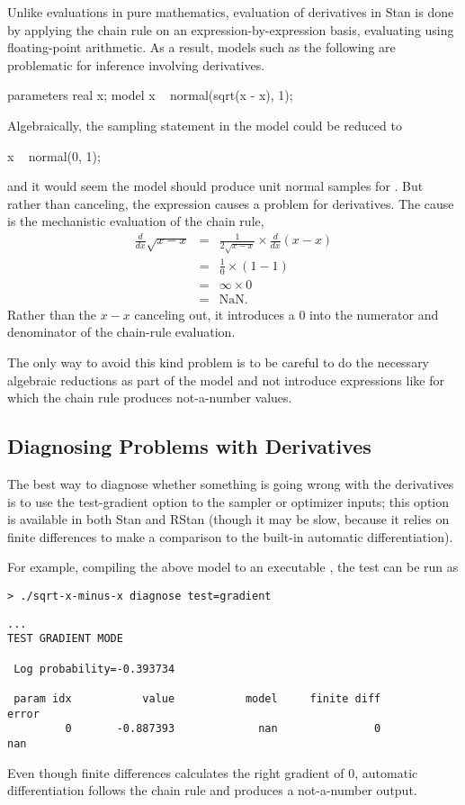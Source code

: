 Unlike evaluations in pure mathematics, evaluation of derivatives in
Stan is done by applying the chain rule on an expression-by-expression
basis, evaluating using floating-point arithmetic.  As a result,
models such as the following are problematic for inference involving
derivatives.
%
\begin{stancode}
parameters {
  real x;
}
model {
  x ~ normal(sqrt(x - x), 1);
}
\end{stancode}
%
Algebraically, the sampling statement in the model could be reduced to
%
\begin{stancode}
  x ~ normal(0, 1);
\end{stancode}
%
and it would seem the model should produce unit normal samples for
.  But rather than canceling, the expression  causes a problem for derivatives.  The cause is the mechanistic
evaluation of the chain rule,
%
\begin{eqnarray*}
\frac{d}{dx} \sqrt{x - x}
& = &
\frac{1}{2 \sqrt{x - x}} \times \frac{d}{dx} (x - x)
\\[4pt]
& = &
\frac{1}{0} \times (1 - 1)
\\[4pt]
& = &
\infty \times 0
\\[4pt]
& = & \mbox{NaN}.
\end{eqnarray*}
%
Rather than the $x - x$ canceling out, it introduces a 0 into the
numerator and denominator of the chain-rule evaluation.

The only way to avoid this kind problem is to be careful to do the
necessary algebraic reductions as part of the model and not introduce
expressions like  for which the chain rule produces
not-a-number values.

\subsection{Diagnosing Problems with Derivatives}

The best way to diagnose whether something is going wrong with the
derivatives is to use the test-gradient option to the sampler or
optimizer inputs; this option is available in both Stan and RStan
(though it may be slow, because it relies on finite differences to
make a comparison to the built-in automatic differentiation).

For example, compiling the above model to an executable
, the test can be run as
%
\begin{Verbatim}
> ./sqrt-x-minus-x diagnose test=gradient
\end{Verbatim}
\begin{Verbatim}[fontsize=\small]
...
TEST GRADIENT MODE

 Log probability=-0.393734

 param idx           value           model     finite diff           error
         0       -0.887393             nan               0             nan
\end{Verbatim}
%
Even though finite differences calculates the right gradient of 0,
automatic differentiation follows the chain rule and produces a
not-a-number output.

